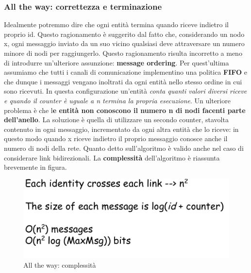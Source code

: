 \documentclass[12pt]{article}
\begin{document}
		\subsubsection{All the way: correttezza e terminazione}
			Idealmente potremmo dire che ogni entità termina quando riceve indietro il proprio id. Questo ragionamento è suggerito dal fatto che, considerando un nodo x, ogni messaggio inviato da un suo vicino qualsiasi deve attraversare un numero minore di nodi per raggiungerlo. Questo ragionamento risulta incorretto a meno di introdurre un'ulteriore assunzione: \textbf{message ordering}. Per quest'ultima assumiamo che tutti i canali di comunicazione implementino una politica \textbf{FIFO} e che dunque i messaggi vengano inoltrati da ogni entità nello stesso ordine in cui sono ricevuti. In questa configurazione un'entità \textit{conta quanti valori diversi riceve e quando il counter è uguale a n termina la propria esecuzione}. Un ulteriore problema è che l\textbf{e entità non conoscono il numero n di nodi facenti parte dell'anello}. La soluzione è quella di utilizzare un secondo counter, stavolta contenuto in ogni messaggio, incrementato da ogni altra entità che lo riceve: in questo modo quando x riceve indietro il proprio messaggio conosce anche il numero di nodi della rete. Quanto detto sull'algoritmo è valido anche nel caso di considerare link bidirezionali.
			La \textbf{complessità} dell'algoritmo è riassunta brevemente in figura.  
			\begin{figure}[h!]
				\centering
				\includegraphics[scale=0.30]{img/allcomp.png}
				\caption{All the way: complessità}
			\end{figure}
		
\end{document}
